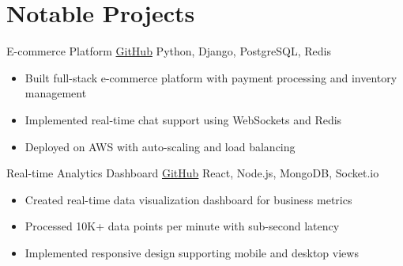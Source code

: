 \section{Notable Projects}

\projectitem
    {E-commerce Platform}               %
    {\href{https://github.com/yourgithub/ecommerce}{GitHub}}  %
    {Python, Django, PostgreSQL, Redis}  %

\begin{itemize}
    \item Built full-stack e-commerce platform with payment processing and inventory management
    \item Implemented real-time chat support using WebSockets and Redis
    \item Deployed on AWS with auto-scaling and load balancing
\end{itemize}

\projectitem
    {Real-time Analytics Dashboard}
    {\href{https://github.com/yourgithub/analytics}{GitHub}}
    {React, Node.js, MongoDB, Socket.io}

\begin{itemize}
    \item Created real-time data visualization dashboard for business metrics
    \item Processed 10K+ data points per minute with sub-second latency
    \item Implemented responsive design supporting mobile and desktop views
\end{itemize}